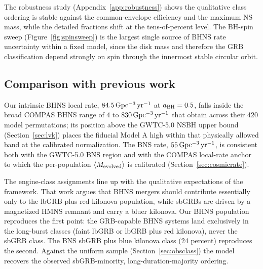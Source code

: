 \documentclass[twocolumn,amsmath]{aastex702}
\newcommand{\aBH}{a_{\rm BH}}
\newcommand{\Gpcyr}{{\rm Gpc^{-3}\,yr^{-1}}}
\begin{document}
The robustness study (Appendix~\ref{app:robustness}) shows the qualitative class
ordering is stable against the common-envelope efficiency and the maximum NS mass,
while the detailed fractions shift at the tens-of-percent level. The BH-spin
sweep (Figure~\ref{fig:spinsweep}) is the largest single source of BHNS rate
uncertainty within a fixed model, since the disk mass and therefore the GRB
classification depend strongly on spin through the innermost stable circular
orbit.

\subsection{Comparison with previous work} \label{sec:priorwork}

Our intrinsic BHNS local rate, $84.5\,\Gpcyr$ at $\aBH = 0.5$, falls inside the
broad COMPAS BHNS range of $4$ to $830\,\Gpcyr$ that \citet{broekgaarden2021}
obtain across their 420 model permutations; its position above the GWTC-5.0
NSBH upper bound (Section~\ref{sec:lvk}) places the fiducial Model A high
within that physically allowed band at the calibrated normalization. The BNS
rate, $55\,\Gpcyr$, is consistent both with the GWTC-5.0 BNS region and with the
COMPAS local-rate anchor to which the per-population $\langle M_{\rm evolved}\rangle$
is calibrated (Section~\ref{sec:cosmicrate}).

The engine-class assignments line up with the qualitative expectations of the
\citet{gottlieb2024} framework. That work argues that BHNS mergers should
contribute essentially only to the lbGRB plus red-kilonova population, while
sbGRBs are driven by a magnetized HMNS remnant and carry a bluer kilonova. Our
BHNS population reproduces the first point: the GRB-capable BHNS systems land
exclusively in the long-burst classes (faint lbGRB or lbGRB plus red
kilonova), never the sbGRB class. The BNS sbGRB plus blue kilonova class (24
percent) reproduces the second. Against the \citet{rastinejad2024} uniform
sample (Section~\ref{sec:obsclass}) the model recovers the observed
sbGRB-minority, long-duration-majority ordering.
\end{document}
